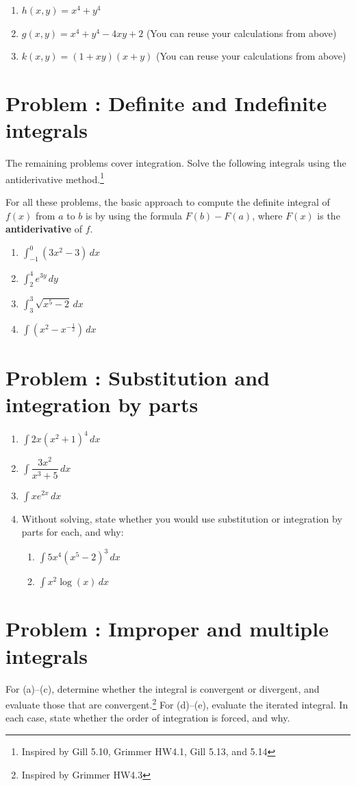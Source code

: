 \documentclass[11pt]{article}
\newcounter{problem}
\newcommand{\problem}[1]{\stepcounter{problem}\section*{Problem \theproblem: #1}}
\begin{document}
\begin{enumerate}[label=\alph*.]
\item $h(x,y) = x^4+y^4$
\item $g(x,y) = x^4+y^4-4xy+2$ (You can reuse your calculations from above)
\item $k(x,y) = (1+xy)(x+y)$ (You can reuse your calculations from above)
\end{enumerate}


\problem{Definite and Indefinite integrals}

The remaining problems cover integration. Solve the following integrals
using the antiderivative method.\footnote{Inspired by Gill 5.10, Grimmer
  HW4.1, Gill 5.13, and 5.14}

For all these problems, the basic approach to compute the definite
integral of $f(x)$ from $a$ to $b$ is by using the formula $F(b) - F(a)$,
where $F(x)$ is the \textbf{antiderivative} of $f$.

\begin{enumerate}[label=\alph*.]
\item $\int_{-1}^{0} (3x^2 - 3) \,dx$
\item $\int_2^4 e^{3y} \,dy$
\item $\int_3^3 \sqrt{x^5 - 2} \,dx$
\item $\int \left(x^2 - x^{-\frac{1}{2}}\right) \,dx$
\end{enumerate}


\problem{Substitution and integration by parts}
\begin{enumerate}[label=\alph*.]
\item $\int 2x(x^2+1)^4 \,dx$
\item $\int \dfrac{3x^2}{x^3+5} \,dx$
\item $\int x e^{2x} \,dx$

\item Without solving, state whether you would use substitution or
  integration by parts for each, and why:
  \begin{enumerate}[label=\roman*.]
  \item $\int 5x^4 \left(x^5 - 2\right)^{3} \,dx$
  \item $\int x^2 \log(x) \,dx$
  \end{enumerate}
\end{enumerate}

\problem{Improper and multiple integrals}

For (a)--(c), determine whether the integral is convergent or divergent,
and evaluate those that are convergent.\footnote{Inspired by Grimmer
  HW4.3} For (d)--(e), evaluate the iterated integral. In each case,
state whether the order of integration is forced, and why.
\end{document}
